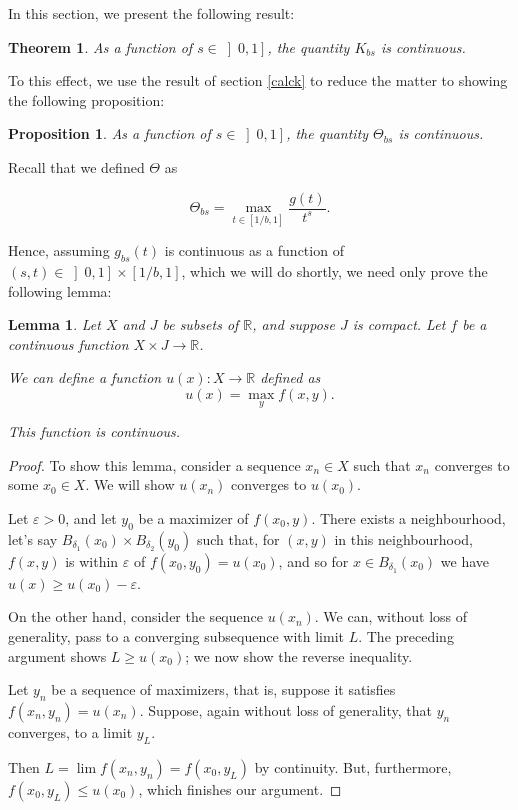 \documentclass[11pt, reqno]{amsart}
\newcommand{\R}{\mathbb{R}}
\newtheorem{lemma}{Lemma}
\newtheorem{theorem}{Theorem}
\newtheorem{prop}{Proposition}
\begin{document}
In this section, we present the following result:

\begin{theorem}
As a function of $s \in \left]0, 1\right]$, the quantity $K_{bs}$ is continuous.
\end{theorem}

To this effect, we use the result of section \ref{calck} to reduce the matter to showing the following proposition:

\begin{prop}
As a function of $s \in \left]0, 1\right]$, the quantity $\Theta_{bs}$ is continuous.
\end{prop}

Recall that we defined $\Theta$ as

\[ \Theta_{bs} = \max_{t \in \left[ 1/b, 1 \right]} \frac{g(t)}{t^s}.\]

Hence, assuming $g_{bs}(t)$ is continuous as a function of $(s, t) \in \left]0, 1\right] \times \left[1/b, 1\right]$, which we will do shortly, we need only prove the following lemma:

\begin{lemma}
Let $X$ and $J$ be subsets of $\R$, and suppose $J$ is compact. Let $f$ be a continuous function $X \times J \to \R$.

We can define a function $u(x) : X \to \R$ defined as
\[ u(x) = \max_y f(x,y).\]

This function is continuous.
\end{lemma}

\begin{proof}
To show this lemma, consider a sequence $x_n \in X$ such that $x_n$ converges to some $x_0 \in X$. We will show $u(x_n)$ converges to $u(x_0)$.

Let $\varepsilon > 0$, and let $y_0$ be a maximizer of $f(x_0, y)$. There exists a neighbourhood, let's say $B_{\delta_1}(x_0) \times B_{\delta_2}(y_0)$ such that, for $(x,y)$ in this neighbourhood, $f(x,y)$ is within $\varepsilon$ of $f(x_0, y_0) = u(x_0)$, and so for $x \in B_{\delta_1}(x_0)$ we have $u(x) \geq u(x_0) - \varepsilon$.

On the other hand, consider the sequence $u(x_n)$. We can, without loss of generality, pass to a converging subsequence with limit $L$. The preceding argument shows $L \geq u(x_0)$; we now show the reverse inequality.

Let $y_n$ be a sequence of maximizers, that is, suppose it satisfies $f(x_n, y_n) = u(x_n)$. Suppose, again without loss of generality, that $y_n$ converges, to a limit $y_L$.

Then $L = \lim f(x_n, y_n) = f(x_0, y_L)$ by continuity. But, furthermore, $f(x_0, y_L) \leq u(x_0)$, which finishes our argument.
\end{proof}
\end{document}
